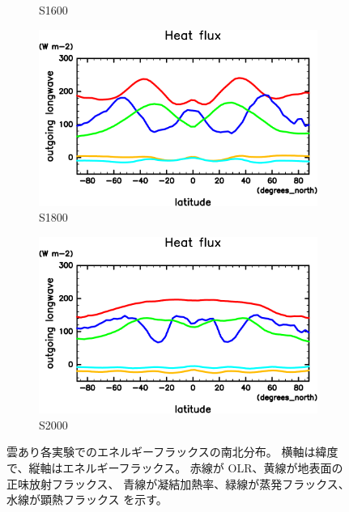 \documentclass[body]{subfiles}
\begin{document}
\begin{figure}[t]
\begin{subfigure}{.4\textwidth}
		\caption{S1600}\label{EnFlx南北分布S1600}
	\end{subfigure}
	\begin{subfigure}{.4\textwidth}
		\centering
		\includegraphics[width=\textwidth]{S1800/HeatFlx,time=3650:4015-crop-rotate.pdf}
		\caption{S1800}\label{EnFlx南北分布S1800}
	\end{subfigure}
	\begin{subfigure}{.4\textwidth}
		\centering
		\includegraphics[width=\textwidth]{S2000/HeatFlx,time=7300:7665-crop-rotate.pdf}
		\caption{S2000}\label{EnFlx南北分布S2000}
	\end{subfigure}
	\caption[雲あり各実験でのエネルギーフラックス南北分布]{
		雲あり各実験でのエネルギーフラックスの南北分布。
		横軸は緯度で、縦軸はエネルギーフラックス\hmu*{[W/m^2]}。
		赤線が OLR、黄線が地表面の正味放射フラックス、
		青線が凝結加熱率、緑線が蒸発フラックス、水線が顕熱フラックス
		を示す。
	}\label{EnFlx南北分布}
\end{figure}
\end{document}
